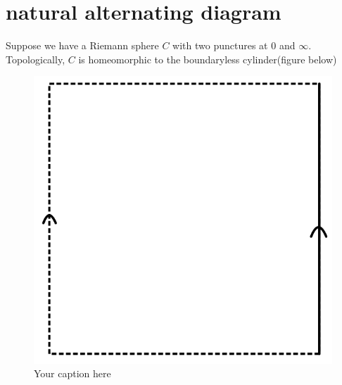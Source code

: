 \section{natural alternating diagram}

Suppose we have a Riemann sphere $C$ with two punctures at $0$ and $\infty$. Topologically, $C$ is homeomorphic to the boundaryless cylinder(figure below)
\begin{figure}[H] %
    \centering
    \includegraphics[scale = 0.95]{diagrams/natural_alternating_diagrams/1.png} %
    \caption{Your caption here}
    \label{fig:your-label}
\end{figure}


